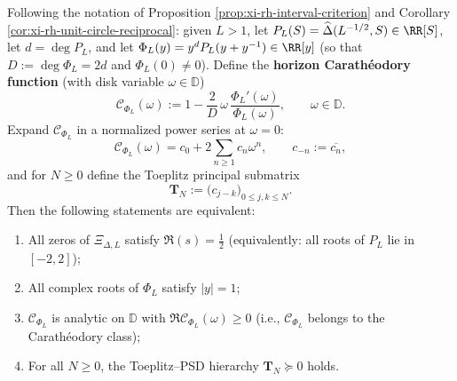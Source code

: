 \begin{theorem}\label{thm:xi-slice-horizon-carath-toeplitz}
Following the notation of Proposition \ref{prop:xi-rh-interval-criterion} and Corollary \ref{cor:xi-rh-unit-circle-reciprocal}:
given \(L>1\), let
\(
P_L(S)=\widehat\Delta(L^{-1/2},S)\in\RR[S]
\),
let \(d=\deg P_L\), and let
\(
\Phi_L(y)=y^{d}P_L(y+y^{-1})\in\RR[y]
\)
(so that \(D:=\deg\Phi_L=2d\) and \(\Phi_L(0)\neq 0\)).
Define the \textbf{horizon Carath\'eodory function} (with disk variable \(\omega\in\mathbb{D}\))
\begin{equation}\label{eq:xi-slice-carath-def}
\boxed{\;
\mathscr{C}_{\Phi_L}(\omega)
:=
1-\frac{2}{D}\,\omega\,\frac{\Phi_L'(\omega)}{\Phi_L(\omega)},
\qquad \omega\in\mathbb{D}.
\;}
\end{equation}
Expand \(\mathscr{C}_{\Phi_L}\) in a normalized power series at \(\omega=0\):
\[
\mathscr{C}_{\Phi_L}(\omega)=c_0+2\sum_{n\ge 1}c_n\omega^n,
\qquad c_{-n}:=\overline{c_n},
\]
and for \(N\ge 0\) define the Toeplitz principal submatrix
\[
\mathbf{T}_N:=\bigl(c_{j-k}\bigr)_{0\le j,k\le N}.
\]
Then the following statements are equivalent:
\begin{enumerate}
  \item All zeros of \(\Xi_{\Delta,L}\) satisfy \(\Re(s)=\tfrac12\) (equivalently: all roots of \(P_L\) lie in \([-2,2]\));
  \item All complex roots of \(\Phi_L\) satisfy \(|y|=1\);
  \item \(\mathscr{C}_{\Phi_L}\) is analytic on \(\mathbb{D}\) with \(\Re \mathscr{C}_{\Phi_L}(\omega)\ge 0\) (i.e., \(\mathscr{C}_{\Phi_L}\) belongs to the Carath\'eodory class);
  \item For all \(N\ge 0\), the Toeplitz--PSD hierarchy \(\mathbf{T}_N\succeq 0\) holds.
\end{enumerate}
\end{theorem}
